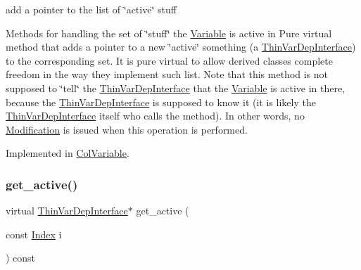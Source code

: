 add a pointer to the list of \char`\"{}active\char`\"{} stuff 

Methods for handling the set of \char`\"{}stuff\char`\"{} the \mbox{\hyperlink{class_s_m_spp__di__unipi__it_1_1_variable}{Variable}} is active in Pure virtual method that adds a pointer to a new \char`\"{}active\char`\"{} something (a \mbox{\hyperlink{class_s_m_spp__di__unipi__it_1_1_thin_var_dep_interface}{Thin\+Var\+Dep\+Interface}}) to the corresponding set. It is pure virtual to allow derived classes complete freedom in the way they implement such list. Note that this method is not supposed to \char`\"{}tell\char`\"{} the \mbox{\hyperlink{class_s_m_spp__di__unipi__it_1_1_thin_var_dep_interface}{Thin\+Var\+Dep\+Interface}} that the \mbox{\hyperlink{class_s_m_spp__di__unipi__it_1_1_variable}{Variable}} is active in there, because the \mbox{\hyperlink{class_s_m_spp__di__unipi__it_1_1_thin_var_dep_interface}{Thin\+Var\+Dep\+Interface}} is supposed to know it (it is likely the \mbox{\hyperlink{class_s_m_spp__di__unipi__it_1_1_thin_var_dep_interface}{Thin\+Var\+Dep\+Interface}} itself who calls the method). In other words, no \mbox{\hyperlink{class_s_m_spp__di__unipi__it_1_1_modification}{Modification}} is issued when this operation is performed. 

Implemented in \mbox{\hyperlink{class_s_m_spp__di__unipi__it_1_1_col_variable_a0d6d3734871ae74a4d33fc5604fcd141}{Col\+Variable}}.

\mbox{\label{class_s_m_spp__di__unipi__it_1_1_variable_a5debd2bbc900586b78fb5243edc700f4}} 
\subsubsection{\texorpdfstring{get\+\_\+active()}{get\_active()}}
{\footnotesize\ttfamily virtual \mbox{\hyperlink{class_s_m_spp__di__unipi__it_1_1_thin_var_dep_interface}{Thin\+Var\+Dep\+Interface}}$\ast$ get\+\_\+active (\begin{DoxyParamCaption}\item[{const \mbox{\hyperlink{class_s_m_spp__di__unipi__it_1_1_variable_ad53d6229d7ec28555a9c9c2fd9abf773}{Index}}}]{i }\end{DoxyParamCaption}) const\hspace{0.3cm}{\ttfamily [pure virtual]}}



